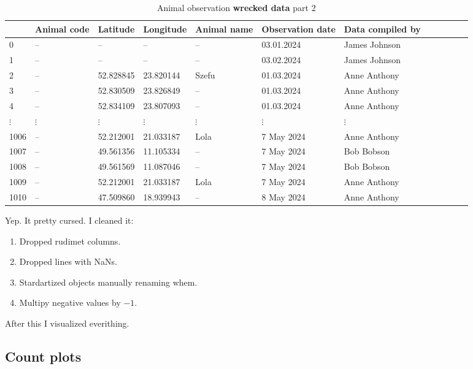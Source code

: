 \documentclass{article} %
\begin{document}
\begin{table}[ht]
    \centering
    \begin{tabular}{llllllllllll}
        \hline
        & Animal code & Latitude & Longitude & Animal name & Observation date & Data compiled by \\
        \hline
        0 & -- & -- & -- & -- & 03.01.2024 & James Johnson \\
        1 & -- & -- & -- & -- & 03.02.2024 & James Johnson \\
        2 & -- & 52.828845 & 23.820144 & Szefu & 01.03.2024 & Anne Anthony \\
        3 & -- & 52.830509 & 23.826849 & -- & 01.03.2024 & Anne Anthony \\
        4 & -- & 52.834109 & 23.807093 & -- & 01.03.2024 & Anne Anthony \\
        $\vdots$ & $\vdots$ & $\vdots$ & $\vdots$ & $\vdots$ & $\vdots$ & $\vdots$ \\
        1006 & -- & 52.212001 & 21.033187 & Lola & 7 May 2024 & Anne Anthony \\
        1007 & -- & 49.561356 & 11.105334 & -- & 7 May 2024 & Bob Bobson \\
        1008 & -- & 49.561569 & 11.087046 & -- & 7 May 2024 & Bob Bobson \\
        1009 & -- & 52.212001 & 21.033187 & Lola & 7 May 2024 & Anne Anthony \\
        1010 & -- & 47.509860 & 18.939943 & -- & 8 May 2024 & Anne Anthony \\
        \hline
    \end{tabular}
    \caption{Animal observation \textbf{wrecked data} part 2}
    \label{tab:animal_data}
\end{table}

Yep. It pretty cursed. I cleaned it:

\begin{enumerate}
  \item Dropped rudimet columns.
  \item Dropped lines with NaNs.
  \item Stardartized objects manually renaming whem.
  \item Multipy negative values by $-1$.
\end{enumerate}

After this I visualized everithing.

\subsection{Count plots}
\end{document}
